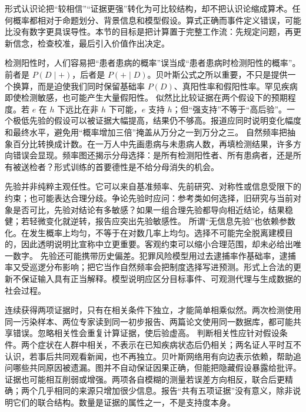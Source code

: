 形式认识论把“较相信”“证据更强”转化为可比较结构，却不把认识论缩成算术。任何概率都相对于命题划分、背景信息和模型假设。算式正确而事件定义错误，可能比没有数字更具误导性。本节的目标是把计算置于完整工作流：先规定问题，再更新信念，检查校准，最后引入价值作出决定。

检测阳性时，人们容易把“患者患病的概率”误当成“患者患病时检测阳性的概率”。前者是 \(P(D\mid +)\)，后者是 \(P(+\mid D)\)。贝叶斯公式之所以重要，不只是提供一个换算，而是迫使我们同时保留基础率 \(P(D)\)、真阳性率和假阳性率。罕见疾病即使检测敏感，也可能产生大量假阳性。 似然比比较证据在两个假设下的预期程度。若 \(e\) 在 \(h\) 下远比在非 \(h\) 下可能，\(e\) 支持 \(h\)；但“强支持”不等于“高后验”。一个极低先验的假设可以被证据大幅提高，结果仍不够高。报道应同时说明变化幅度和最终水平，避免用“概率增加三倍”掩盖从万分之一到万分之三。 自然频率把抽象百分比转换成计数。在一万人中先画患病与未患病人数，再填检测结果，许多方向错误会显现。频率图还揭示分母选择：是所有检测阳性者、所有患病者，还是所有被送检者？形式训练的首要德性是不给分母消失的机会。

先验并非纯粹主观任性。它可以来自基准频率、先前研究、对称性或信息受限下的约束；也可能表达合理分歧。争论先验时应问：参考类如何选择，旧研究与当前对象是否可比，先验对结论有多敏感？如果一组合理先验都导向相近结论，结果稳健；若轻微变化就逆转，报告应突出先验敏感性。 所谓“无信息先验”也依赖参数化。在发生概率上均匀，不等于在对数几率上均匀。选择不可能完全脱离建模目的，因此透明说明比宣称中立更重要。客观约束可以缩小合理范围，却未必给出唯一数字。\parencite{howson2006} 先验还可能携带历史偏差。犯罪风险模型用过去逮捕率作基础率，逮捕率又受巡逻分布影响；把它当作自然频率会把制度选择写进预测。形式上合法的更新不保证输入具有正当解释。模型说明应区分目标事件、可观测代理与生成数据的社会过程。

连续获得两项证据时，只有在相关条件下独立，才能简单相乘似然。两次检测使用同一污染样本、两位专家读到同一初步报告、两篇论文使用同一数据库，都可能共享错误。忽略相关性会重复计算证据，使后验虚高。 判断相关性应针对假设条件。两个症状在人群中相关，不表示在已知疾病状态后仍相关；两名证人平时互不认识，若事后共同观看新闻，也不再独立。贝叶斯网络用有向边表示依赖，帮助追问哪些共同原因被遗漏。图并不自动保证因果正确，但能把隐藏假设暴露给批评。 证据也可能相互削弱或增强。两项各自模糊的测量若误差方向相反，联合后更精确；两个几乎相同的来源只增加很少信息。报告“共有五项证据”没有意义，除非说明它们的联合结构。数量是证据的属性之一，不是支持度本身。

